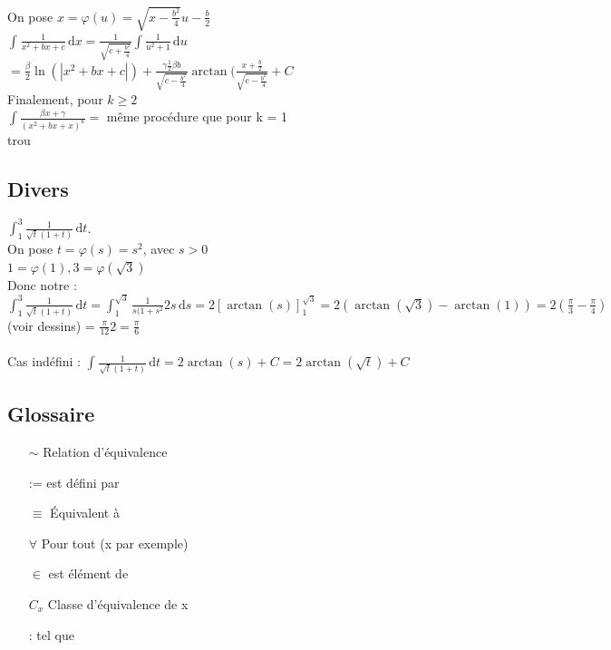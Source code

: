 \documentclass[12pt,a4paper]{article}
\newcommand{\intx}[3]{\ensuremath{\int_{#1}^{#2} #3 \, \mathrm dx}}
\newcommand{\intt}[3]{\ensuremath{\int_{#1}^{#2} #3 \, \mathrm dt}}
\begin{document}
{\begin{enumerate}
\begin{itemize}
		On pose $x = \varphi(u) = \sqrt{x-\frac{b^2}{4}}u - \frac{b}{2}$\\
		$\intx{}{}{\frac{1}{x^2+bx+c}} = \frac{1}{\sqrt{c+\frac{b^2}{4}}}\int{\frac{1}{u^2+1}} \, \mathrm du$\\
		$= \frac{\beta}{2}\ln(|x^2+bx+c|) + \frac{\gamma\frac{1}{2}\beta b}{\sqrt{c-\frac{b^2}{4}}} \arctan (\frac{x+\frac{b}{2}}{\sqrt{c-\frac{b^2}{4}}} + C$\\
		Finalement, pour $k \geq 2$\\
		$\int\frac{\beta x + \gamma}{(x^2+bx+x)^k} = $ même procédure que pour k = 1	\\
		{trou}
	\end{itemize}
\end{enumerate}
\subsection{Divers}
$\intt{1}{3}{\frac{1}{\sqrt{t}(1+t)}}$. \\
On pose $t = \varphi(s) = s^2$, avec $ s > 0$\\
$1 = \varphi(1), 3 = \varphi(\sqrt{3})$\\
Donc notre :$\intt{1}{3}{\frac{1}{\sqrt{t}(1+t)}} = \int_1^{\sqrt{3}} \frac{1}{s(1+s^2} 2s \, \mathrm ds =  2[\arctan(s)]_1^{\sqrt{3}} = 2(\arctan(\sqrt{3}) - \arctan(1)) = 2(\frac{\pi}{3}-\frac{\pi}{4})$ (voir dessins) = $\frac{\pi}{12}2= \frac{\pi}{6}$\\
\\
Cas indéfini : $\intt{}{}{\frac{1}{\sqrt{t}(1+t)}} = 2 \arctan(s) + C = 2\arctan(\sqrt{t}) + C$








\subsection{Glossaire} 
\begin{itemize}
\item[$\sim$] Relation d'équivalence
\item[:=] est défini par
\item[$\equiv$] Équivalent à
\item[$\forall$] Pour tout (x par exemple)
\item[$\in$] est élément de
\item[$C_x$] Classe d'équivalence de x
\item[:] tel que
\end{itemize}

}
\end{document}
